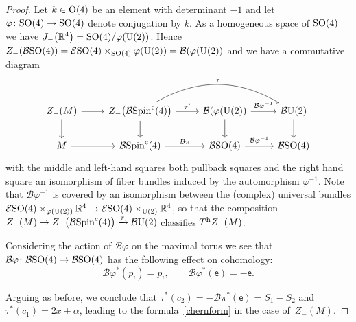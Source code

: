 \documentclass[pdftex]{sigma}%
\newcommand{\R}{\mathbb{R}}
\numberwithin{equation}{section}
\begin{document}
\begin{proof}
Let $k \in {\rm O}(4)$ be an element with determinant $-1$ and let
$\varphi \colon {\rm SO}(4) \to {\rm SO}(4)$ denote conjugation by $k$. As a homogeneous space
of ${\rm SO}(4)$ we have $J_-\big(\R^4\big)={\rm SO}(4)/\varphi({\rm U}(2))$. Hence
$Z_-({\mathcal B}{\rm SO}(4))= {\mathcal E}{\rm SO}(4) \times_{{\rm SO}(4)}\varphi({\rm U}(2)) = {\mathcal B}(\varphi({\rm U}(2))$
and we have a commutative diagram
\[
\begin{tikzcd}
Z_-(M) \ar[r] \ar[d] & Z_-\big({\mathcal B}{\rm Spin}^{\rm c}(4)\big) \ar[r,"\tau'"] \ar[d] \ar[rr,bend left, "\tau"] & {\mathcal B}(\varphi({\rm U}(2)) \ar[r, "{\mathcal B}\varphi^{-1}"] \ar[d] & {\mathcal B}{\rm U}(2) \ar[d] \\
M \ar[r] & {\mathcal B}{\rm Spin}^{\rm c}(4) \ar[r, "{\mathcal B}\pi"] & {\mathcal B}{\rm SO}(4) \ar[r,"{\mathcal B}\varphi^{-1}"] & {\mathcal B}{\rm SO}(4)
\end{tikzcd}
\]
with the middle and left-hand squares both pullback squares
and the right hand square an
isomorphism of fiber bundles induced by the automorphism $\varphi^{-1}$.
Note that ${\mathcal B}\varphi^{-1}$ is covered by an isomorphism between the (complex) universal
bundles ${\mathcal E}{\rm SO}(4) \times_{\varphi({\rm U}(2))} \R^4 \to {\mathcal E}{\rm SO}(4)\times_{{\rm U}(2)} \R^4$,
so that the composition $Z_-(M) \to Z_-\big({\mathcal B}{\rm Spin}^{\rm c}(4)\big) \xrightarrow{\tau} {\mathcal B}{\rm U}(2)$
classifies $T^{\rm h} Z_-(M)$.

Considering the action of ${\mathcal B}\varphi$ on the maximal torus we see that ${\mathcal B}\varphi \colon
{\mathcal B}{\rm SO}(4) \to {\mathcal B}{\rm SO}(4)$ has the following effect on cohomology:
\[{\mathcal B}\varphi^*(p_i)=p_i, \qquad {\mathcal B}\varphi^* (\mathsf{e}) = -\mathsf{e}.\]

Arguing as before, we conclude that $\tau^*(c_2)=-{\mathcal B}\pi^*(\mathsf{e})=S_1-S_2$ and
$\tau^*(c_1)=2x+\alpha$,
leading to the formula~\eqref{chernform} in the case of~$Z_-(M)$.
\end{proof}
\end{document}
